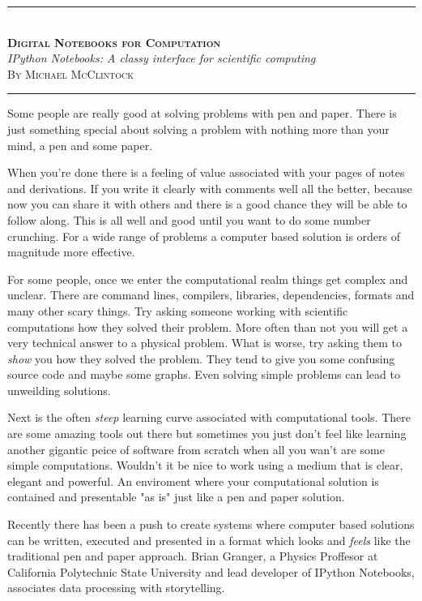 \documentclass[11pt, a4paper]{article}  %
\begin{document}
\begin{center}
    \rule[0.5ex]{1\columnwidth}{1pt}
    \\[4mm]
    \textbf{\textsc{\Huge Digital Notebooks for Computation}}
    \\[6mm]
    \textit{\Large IPython Notebooks: A classy interface for scientific computing}
    \\[6mm]
    \textsc{\large By Michael McClintock}
    \\[4mm]
    \rule[0.5ex]{1\columnwidth}{1pt}
\end{center}

\begin{multicols}{2}

Some people are really good at solving problems with pen and paper. There is
just something special about solving a problem with nothing more than your
mind, a pen and some paper.

When you're done there is a feeling of value associated with your pages of
notes and derivations. If you write it clearly with comments well all the
better, because now you can share it with others and there is a good chance
they will be able to follow along. This is all well and good until you want to
do some number crunching. For a wide range of problems a computer based
solution is orders of magnitude more effective.

For some people, once we enter the computational realm things get complex and
unclear. There are command lines, compilers, libraries, dependencies, formats
and many other scary things. Try asking someone working with scientific
computations how they solved their problem. More often than not you will get a
very technical answer to a physical problem. What is worse, try asking them to
\emph{show} you how they solved the problem. They tend to give you some
confusing source code and maybe some graphs. Even solving simple problems can
lead to unweilding solutions.

Next is the often \emph{steep} learning curve associated with computational
tools. There are some amazing tools out there but sometimes you just don't
feel like learning another gigantic peice of software from scratch when all
you wan't are some simple computations. Wouldn't it be nice to work using a
medium that is clear, elegant and powerful. An enviroment where your
computational solution is contained and presentable "as is" just like a pen
and paper solution.

Recently there has been a push to create systems where computer based
solutions can be written, executed and presented in a format which looks and
\emph{feels} like the traditional pen and paper approach. Brian Granger, a
Physics Proffesor at California Polytechnic State University and lead
developer of IPython Notebooks, associates data processing with storytelling.


\end{multicols}
\end{document}
